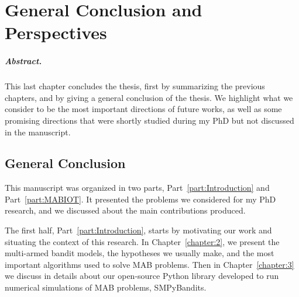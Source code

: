 
\chapter{General Conclusion and Perspectives}
\label{chapter:conclusion}

\graphicspath{{2-Chapters/6-Chapter/Images/}}

\paragraph{Abstract.}
%
This last chapter concludes the thesis, first by summarizing the previous chapters, and by giving a general conclusion of the thesis.
%
We highlight what we consider to be the most important directions of future works, as well as some promising directions that were shortly studied during my PhD but not discussed in the manuscript.


\minitoc

\newpage

\section{General Conclusion}


This manuscript was organized in two parts, Part~\ref{part:Introduction} and Part~\ref{part:MABIOT}.
It presented the problems we considered for my PhD research, and we discussed about the main contributions produced.

The first half, Part~\ref{part:Introduction}, starts by motivating our work and situating the context of this research.
In Chapter~\ref{chapter:2}, we present the multi-armed bandit models, the hypotheses we usually make, and the most important algorithms used to solve MAB problems.
Then in Chapter~\ref{chapter:3} we discuss in details about our open-source Python library developed to run numerical simulations of MAB problems, SMPyBandits.

